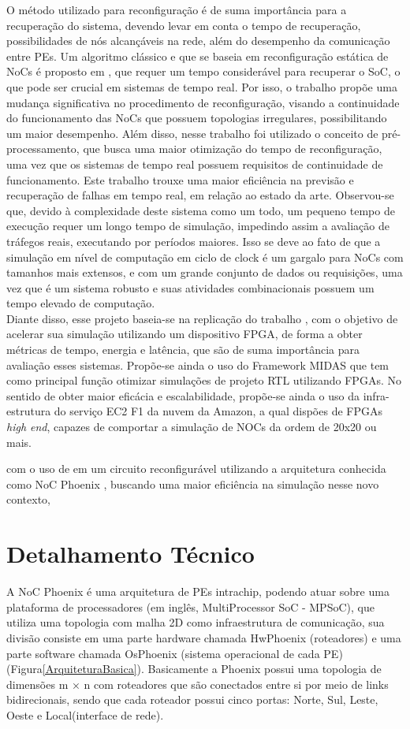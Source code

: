 \documentclass[conference]{IEEEtran}
\begin{document}
	O método utilizado para reconfiguração é de suma importância para a recuperação do sistema, devendo levar em conta o tempo de recuperação, possibilidades de nós alcançáveis na rede, além do desempenho da comunicação entre PEs. Um algoritmo clássico e que se baseia em reconfiguração estática de NoCs é proposto em \cite{b6}, que requer um tempo considerável para recuperar o SoC, o que pode ser crucial em sistemas de tempo real. Por isso, o trabalho \cite{b5} propõe uma mudança significativa no procedimento de reconfiguração, visando a continuidade do funcionamento das NoCs que possuem topologias irregulares, possibilitando um maior desempenho. Além disso, nesse trabalho foi utilizado o conceito de pré-processamento, que busca uma maior otimização do tempo de reconfiguração, uma vez que os sistemas de tempo real possuem requisitos de continuidade de funcionamento. Este trabalho trouxe uma maior eficiência na previsão e recuperação de falhas em tempo real, em relação ao estado da arte. Observou-se que, devido à complexidade deste sistema como um todo, um pequeno tempo de execução requer um longo tempo de simulação, impedindo assim a avaliação de tráfegos reais, executando por períodos maiores. Isso se deve ao fato de que a simulação em nível de computação em ciclo de clock é um gargalo para NoCs com tamanhos mais extensos, e com um grande conjunto de dados ou requisições, uma vez que é um sistema robusto e suas atividades combinacionais possuem um tempo elevado de computação. \\
	Diante disso, esse projeto baseia-se na replicação do trabalho \cite{b5}, com o objetivo de acelerar sua simulação utilizando um dispositivo FPGA, de forma a obter métricas de tempo, energia e latência, que são de suma importância para avaliação esses sistemas. Propõe-se ainda o uso do Framework MIDAS que tem como principal função otimizar simulações de projeto RTL utilizando FPGAs. No sentido de obter maior eficácia e escalabilidade, propõe-se ainda o uso da infra-estrutura do serviço EC2 F1 da nuvem da Amazon, a qual dispões de FPGAs \textit{high end}, capazes de comportar a simulação de NOCs da ordem de 20x20 ou mais.
	
	
	com o uso de em um circuito reconfigurável utilizando a  arquitetura conhecida como NoC Phoenix \cite{b7}, buscando uma maior eficiência na simulação nesse novo contexto,  
	
	\section{Detalhamento Técnico}
	A NoC Phoenix \cite{b7} é uma arquitetura de PEs intrachip, podendo atuar sobre uma plataforma de processadores (em inglês, MultiProcessor SoC - MPSoC), que utiliza uma topologia com malha 2D como infraestrutura de comunicação, sua divisão consiste em uma parte hardware chamada HwPhoenix (roteadores) e uma parte software chamada OsPhoenix (sistema operacional de cada PE)  (Figura\ref{ArquiteturaBasica}). Basicamente a Phoenix possui uma topologia de  dimensões m × n com roteadores que são conectados entre si por meio de links bidirecionais, sendo que cada roteador possui cinco portas: Norte, Sul, Leste, Oeste e Local(interface de rede).\\
	
\end{document}
